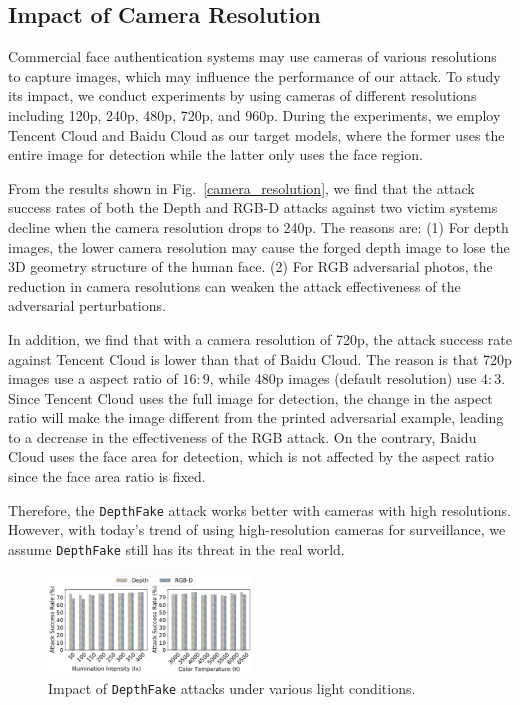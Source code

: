 \subsection{Impact of Camera Resolution} 

Commercial face authentication systems may use cameras of various resolutions to capture images, which may influence the performance of our attack. To study its impact, we conduct experiments by using cameras of different resolutions including 120p, 240p, 480p, 720p, and 960p. During the experiments, we employ Tencent Cloud and Baidu Cloud as our target models, where the former uses the entire image for detection while the latter only uses the face region. 

From the results shown in Fig.~\ref{camera_resolution},  we find that the attack success rates of both the Depth and RGB-D attacks against two victim systems decline  when the camera resolution drops to 240p. The reasons are: 
(1) For depth images, the lower camera resolution may cause the forged depth image to lose the 3D geometry structure of the human face.
(2) For RGB adversarial photos, the reduction in camera resolutions can weaken the attack effectiveness of the adversarial perturbations. 

In addition, we find that with a camera resolution of 720p, the attack success rate against Tencent Cloud is lower than that of Baidu Cloud. The reason is that 720p images use a aspect ratio of $16:9$, while 480p images (default resolution) use $4:3$. Since Tencent Cloud uses the full image  for detection, the change in the aspect ratio will make the image different from the printed adversarial example, leading to a decrease in the effectiveness of the RGB attack. On the contrary, Baidu Cloud uses the face area for detection, which is not affected by the aspect ratio since the face area ratio is fixed.

Therefore, the \texttt{DepthFake} attack works better with cameras with high resolutions. However, with today's trend of using high-resolution cameras for surveillance, we assume \texttt{DepthFake}  still has its threat in the real world.

\begin{figure}[pt]
	\centerline{\includegraphics[width = 0.48\textwidth]{figures/light_condition.pdf}}
	\vspace{-0.15in}
	\caption{Impact of \texttt{DepthFake} attacks under various light conditions.}
	\label{light_condition}
	\vspace{-0.1in}
\end{figure}


